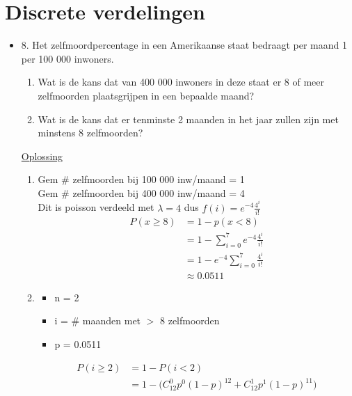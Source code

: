 \documentclass[12pt]{report}
\newcommand{\exercise}[2]{
  #1
  

  \underline{Oplossing}
  
  #2
  
    \hrulefill
}
\begin{document}
\chapter{Discrete verdelingen}
\begin{itemize}[label={}]
 \item {\exercise{
    8. Het zelfmoordpercentage in een Amerikaanse staat bedraagt per maand 1 per 100 000 inwoners.
    \begin{enumerate}
     \item Wat is de kans dat van 400 000 inwoners in deze staat er 8 of meer zelfmoorden plaatsgrijpen in een bepaalde maand?
     \item Wat is de kans dat er tenminste 2 maanden in het jaar zullen zijn met minstens 8 zelfmoorden?
    \end{enumerate}
 }{
    \begin{enumerate}
     \item  Gem \# zelfmoorden bij 100 000 inw/maand = 1\\
            Gem \# zelfmoorden bij 400 000 inw/maand = 4 \\
            Dit is poisson verdeeld met $\lambda = 4$ dus $f(i) = e^{-4}\frac{4^i}{i!}$
            \begin{equation*}
            \begin{split}
            P(x \geq 8) & = 1 - p(x < 8) \\
                        & = 1 - \sum_{i = 0}^{7}e^{-4}\frac{4^i}{i!} \\
                        & = 1 - e^{-4}\sum_{i = 0}^{7}\frac{4^i}{i!} \\
                        & \approx 0.0511
            \end{split}
            \end{equation*}
    \item \begin{itemize}
            \item {n = 2}
            \item {i = \# maanden met $>$ 8 zelfmoorden}
            \item {p = 0.0511}
          \end{itemize}
          \begin{equation*}
            \begin{split}
                P(i \geq 2) &= 1 - P(i < 2) \\
                            &= 1 - \bigg(C_{12}^{0}p^{0}(1 - p)^{12} + C_{12}^{1}p^{1}(1 - p)^{11}\bigg) \\

\end{split}
\end{equation*}
\end{enumerate}}}
\end{itemize}
\end{document}
